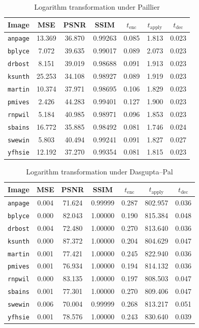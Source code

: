 \begin{table}[h]
	\centering
	\caption{Logarithm transformation under Paillier}
	\label{tbl:log-pal}
    \begin{tabular}{lcccccc}
        \toprule
        Image & MSE  & PSNR & SSIM & $t_\text{enc}$ & $t_\text{apply}$ & $t_\text{dec}$ \\ \midrule
		\texttt{anpage} & 13.369 & 36.870 & 0.99263 & 0.085 & 1.813 & 0.023 \\
		\texttt{bplyce} & 7.072 & 39.635 & 0.99017 & 0.089 & 2.073 & 0.023 \\
		\texttt{drbost} & 8.151 & 39.019 & 0.98688 & 0.091 & 1.913 & 0.023 \\
		\texttt{ksunth} & 25.253 & 34.108 & 0.98927 & 0.089 & 1.919 & 0.023 \\
		\texttt{martin} & 10.374 & 37.971 & 0.98695 & 0.106 & 1.829 & 0.023 \\
		\texttt{pmives} & 2.426 & 44.283 & 0.99401 & 0.127 & 1.900 & 0.023 \\
		\texttt{rnpwil} & 5.184 & 40.985 & 0.98971 & 0.096 & 1.853 & 0.023 \\
		\texttt{sbains} & 16.772 & 35.885 & 0.98492 & 0.081 & 1.746 & 0.024 \\
		\texttt{swewin} & 5.803 & 40.494 & 0.99241 & 0.091 & 1.827 & 0.027 \\
		\texttt{yfhsie} & 12.192 & 37.270 & 0.99354 & 0.081 & 1.815 & 0.023 \\
		\bottomrule
        \end{tabular}
\end{table}
\begin{table}[h]
	\caption{Logarithm transformation under Dasgupta--Pal}
	\label{tbl:log-dp}
    \begin{tabular}{lcccccc}
        \toprule
        Image & MSE  & PSNR & SSIM & $t_\text{enc}$ & $t_\text{apply}$ & $t_\text{dec}$ \\ \midrule
		\texttt{anpage} & 0.004 & 71.624 & 0.99999 & 0.287 & 802.957 & 0.036 \\
		\texttt{bplyce} & 0.000 & 82.043 & 1.00000 & 0.190 & 815.384 & 0.048 \\
		\texttt{drbost} & 0.004 & 72.480 & 1.00000 & 0.270 & 813.640 & 0.036 \\
		\texttt{ksunth} & 0.000 & 87.372 & 1.00000 & 0.204 & 804.629 & 0.047 \\
		\texttt{martin} & 0.001 & 77.421 & 1.00000 & 0.245 & 822.940 & 0.036 \\
		\texttt{pmives} & 0.001 & 76.934 & 1.00000 & 0.194 & 814.132 & 0.036 \\
		\texttt{rnpwil} & 0.000 & 83.135 & 1.00000 & 0.197 & 808.503 & 0.047 \\
		\texttt{sbains} & 0.001 & 77.301 & 1.00000 & 0.270 & 809.406 & 0.047 \\
		\texttt{swewin} & 0.006 & 70.004 & 0.99999 & 0.268 & 813.217 & 0.051 \\
		\texttt{yfhsie} & 0.001 & 78.576 & 1.00000 & 0.243 & 830.640 & 0.039 \\
		\bottomrule
        \end{tabular}
\end{table}


